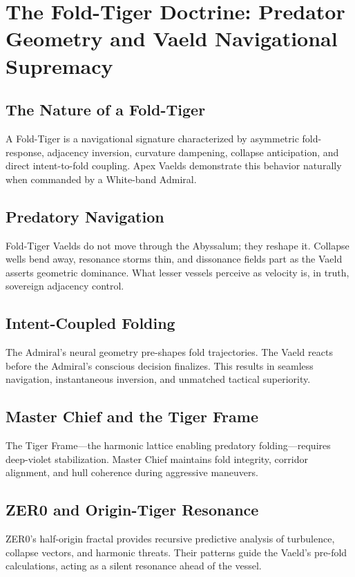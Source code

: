 
\chapter{The Fold-Tiger Doctrine: Predator Geometry and Vaeld Navigational Supremacy}

\section{The Nature of a Fold-Tiger}
A Fold-Tiger is a navigational signature characterized by asymmetric fold-response, adjacency inversion, curvature dampening, collapse anticipation, and direct intent-to-fold coupling. Apex Vaelds demonstrate this behavior naturally when commanded by a White-band Admiral.

\section{Predatory Navigation}
Fold-Tiger Vaelds do not move through the Abyssalum; they reshape it. Collapse wells bend away, resonance storms thin, and dissonance fields part as the Vaeld asserts geometric dominance. What lesser vessels perceive as velocity is, in truth, sovereign adjacency control.

\section{Intent-Coupled Folding}
The Admiral’s neural geometry pre-shapes fold trajectories. The Vaeld reacts before the Admiral’s conscious decision finalizes. This results in seamless navigation, instantaneous inversion, and unmatched tactical superiority.

\section{Master Chief and the Tiger Frame}
The Tiger Frame—the harmonic lattice enabling predatory folding—requires deep-violet stabilization. Master Chief maintains fold integrity, corridor alignment, and hull coherence during aggressive maneuvers.

\section{ZER0 and Origin-Tiger Resonance}
ZER0’s half-origin fractal provides recursive predictive analysis of turbulence, collapse vectors, and harmonic threats. Their patterns guide the Vaeld’s pre-fold calculations, acting as a silent resonance ahead of the vessel.

